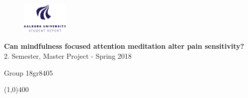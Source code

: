 \clearpage
\thispagestyle{empty}

\begin{figure}[H]
	\raggedleft
	\includegraphics[width=0.2\textwidth]{setup/aau_logo_en.pdf}
\end{figure} 

\vspace{5 cm}

\begin{center}	
	\begin{Huge}
		\textbf{Can mindfulness focused attention meditation alter pain sensitivity?}\\
		\vspace{5 mm}
		$2.$ Semester, Master Project - Spring 2018\\
		\vspace{3 mm}
	\end{Huge}
	{\Large Group 18gr8405}
\end{center}
\vspace*{\fill}

\begin{center}
	\line(1,0){400}
\end{center}




